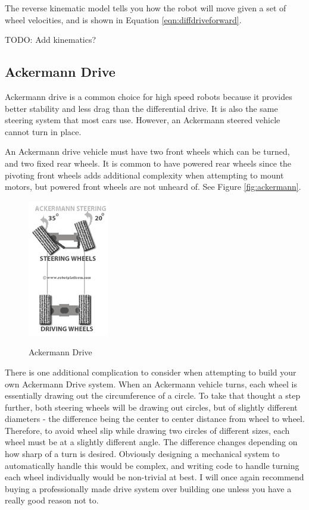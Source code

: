 The reverse kinematic model tells you how the robot will move given a set of wheel velocities, and is shown in Equation \ref{eqn:diffdriveforward}.

TODO: Add kinematics?

\subsection{Ackermann Drive}

Ackermann drive is a common choice for high speed robots because it provides better stability and less drag than the differential drive. It is also the same steering system that most cars use. However, an Ackermann steered vehicle cannot turn in place.

An Ackermann drive vehicle must have two front wheels which can be turned, and two fixed rear wheels. It is common to have powered rear wheels since the pivoting front wheels adds additional complexity when attempting to mount motors, but powered front wheels are not unheard of. See Figure \ref{fig:ackermann}.

\begin{figure}[h]
\centering
\includegraphics[scale=0.75]{Ackermann_Drive2.png}
\label{fig:diffdrive}
\caption{Ackermann Drive}
\end{figure}

There is one additional complication to consider when attempting to build your own Ackermann Drive system. When an Ackermann vehicle turns, each wheel is essentially drawing out the circumference of a circle. To take that thought a step further, both steering wheels will be drawing out circles, but of slightly different diameters - the difference being the center to center distance from wheel to wheel. Therefore, to avoid wheel slip while drawing two circles of different sizes, each wheel must be at a slightly different angle. The difference changes depending on how sharp of a turn is desired. Obviously designing a mechanical system to automatically handle this would be complex, and writing code to handle turning each wheel individually would be non-trivial at best. I will once again recommend buying a professionally made drive system over building one unless you have a really good reason not to.

